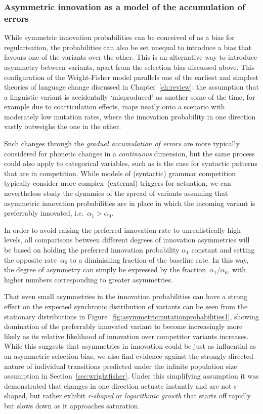 \subsubsection{Asymmetric innovation as a model of the accumulation of errors}

While symmetric innovation probabilities can be conceived of as a bias for regularisation, the probabilities can also be set unequal to introduce a bias that favours one of the variants over the other. This is an alternative way to introduce asymmetry between variants, apart from the selection bias discussed above. This configuration of the Wright-Fisher model parallels one of the earliest and simplest theories of language change discussed in Chapter~\ref{ch:review}: the assumption that a linguistic variant is accidentally `misproduced' as another some of the time, for example due to coarticulation effects, maps neatly onto a scenario with moderately low mutation rates, where the innovation probability in one direction vastly outweighs the one in the other. %

Such changes through the \emph{gradual accumulation of errors} are more typically considered for phonetic changes in a \emph{continuous} dimension, but the same process could also apply to categorical variables, such as is the case for syntactic patterns that are in competition.
While models of (syntactic) grammar competition typically consider more complex~(external) triggers for actuation, we can nevertheless study the dynamics of the spread of variants assuming that asymmetric innovation probabilities are in place in which the incoming variant is preferrably innovated, i.e.~$\alpha_1>\alpha_0$.

In order to avoid raising the preferred innovation rate to unrealistically high levels, all comparisons between different degrees of innovation asymmetries will be based on holding the preferred innovation probability $\alpha_1$ constant and setting the opposite rate~$\alpha_0$ to a diminishing fraction of the baseline rate. In this way, the degree of asymmetry can simply be expressed by the fraction~$\alpha_1/\alpha_0$, with higher numbers corresponding to greater asymmetries.

That even small asymmetries in the innovation probabilities can have a strong effect on the expected synchronic distribution of variants can be seen from the stationary distributions in Figure~\ref{fig:asymmetricmutationprobabilities1}, showing domination of the preferrably innovated variant to become increasingly more likely as its relative likelihood of innovation over competitor variants increases.
While this suggests that asymmetries in innovation could be just as influential as an asymmetric selection bias, we also find evidence against the strongly directed nature of individual transitions predicted under the infinite population size assumption in Section~\ref{sec:wrightfisher}. Under this simplifying assumption it was demonstrated that changes in one direction actuate instantly and are not s-shaped, but rather exhibit \emph{r-shaped} or \emph{logarithmic growth} that starts off rapidly but slows down as it approaches saturation.


